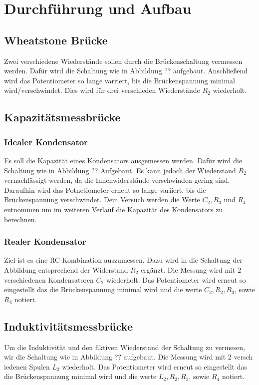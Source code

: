 \section{Durchführung und Aufbau}
\label{sec:Durchführung}

\subsection{Wheatstone Brücke}
Zwei verschiedene Wiederstände sollen durch die Brückenschaltung vermessen werden. Dafür wird die Schaltung wie in Abbildung ?? aufgebaut. Anschließend wird das Potentiometer so lange varriert, bis die Brückenspannung minimal wird/verschwindet. Dies wird für drei verschieden Wiederstände $R_2$ wiederholt.

\subsection{Kapazitätsmessbrücke}
\subsubsection{Idealer Kondensator}
Es soll die Kapazität eines Kondensators ausgemessen werden. Dafür wird die Schaltung wie in Abbildung ?? Aufgebaut. Es kann jedoch der Wiederstand $R_2$ vernachlässigt werden, da die Innenwiderstände verschwinden gering sind. Daraufhin wird das Potnetiometer erneut so lange variiert, bis die Brückenspannung verschwindet. Dem Versuch werden die Werte  $C_2, R_3$ und $R_4$ entnommen um im weiteren Verlauf die Kapazität des Kondensators zu berechnen.

\subsubsection{Realer Kondensator}
Ziel ist es eine RC-Kombination auszumessen. Dazu wird in die Schaltung der Abbildung entsprechend der Widerstand $R_2$ ergänzt. Die Messung wird mit 2 verschiedenen Kondensatoren $C_2$ wiederholt. Das Potentiometer wird erneut so eingestellt das die Brückenspannung minimal wird und die werte $C_2, R_2, R_3$, sowie  $R_4$ notiert.

\subsection{Induktivitätsmessbrücke}
Um die Induktivität und den fiktiven Wiederstand der Schaltung zu vermesen, wir die Schaltung wie in Abbildung ?? aufgebaut. Die Messung wird mit 2 versch
iedenen Spulen $L_2$ wiederholt. Das Potentiometer wird erneut so eingestellt das die Brückenspannung minimal wird und die werte $L_2, R_2, R_3$, sowie
  $R_4$ notiert.
  
